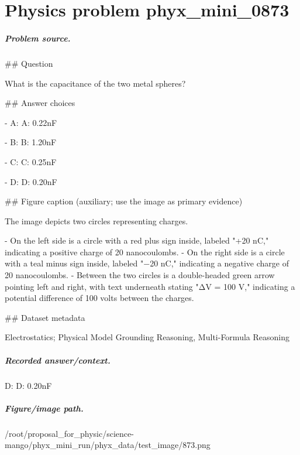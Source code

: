 
\chapter{Physics problem phyx\_mini\_0873}
\label{ch:PhyXMiniProblems_problem_phyx_mini_0873}

\paragraph{Problem source.}
\#\# Question

What is the capacitance of the two metal spheres?

\#\# Answer choices

- A: A: 0.22nF

- B: B: 1.20nF

- C: C: 0.25nF

- D: D: 0.20nF

\#\# Figure caption (auxiliary; use the image as primary evidence)

The image depicts two circles representing charges. 

- On the left side is a circle with a red plus sign inside, labeled "+20 nC," indicating a positive charge of 20 nanocoulombs.
- On the right side is a circle with a teal minus sign inside, labeled "−20 nC," indicating a negative charge of 20 nanocoulombs.
- Between the two circles is a double-headed green arrow pointing left and right, with text underneath stating "ΔV = 100 V," indicating a potential difference of 100 volts between the charges.

\#\# Dataset metadata

Electrostatics; Physical Model Grounding Reasoning, Multi-Formula Reasoning

\paragraph{Recorded answer/context.}
D: D: 0.20nF

\paragraph{Figure/image path.}
/root/proposal\_for\_physic/science-mango/phyx\_mini\_run/phyx\_data/test\_image/873.png

